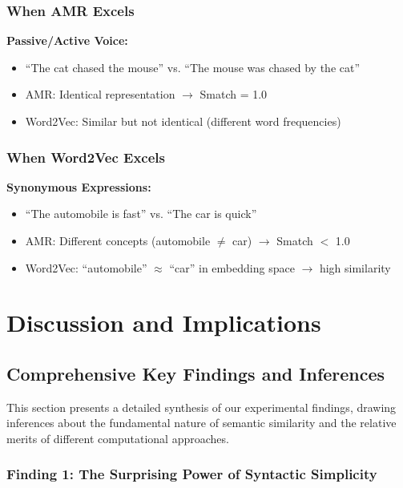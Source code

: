 \documentclass[11pt,a4paper]{article}
\begin{document}
\subsubsection{When AMR Excels}

\textbf{Passive/Active Voice:}
\begin{itemize}
    \item ``The cat chased the mouse'' vs. ``The mouse was chased by the cat''
    \item AMR: Identical representation $\to$ Smatch = 1.0
    \item Word2Vec: Similar but not identical (different word frequencies)
\end{itemize}

\subsubsection{When Word2Vec Excels}

\textbf{Synonymous Expressions:}
\begin{itemize}
    \item ``The automobile is fast'' vs. ``The car is quick''
    \item AMR: Different concepts (automobile $\neq$ car) $\to$ Smatch $<$ 1.0
    \item Word2Vec: ``automobile'' $\approx$ ``car'' in embedding space $\to$ high similarity
\end{itemize}

\section{Discussion and Implications}

\subsection{Comprehensive Key Findings and Inferences}

This section presents a detailed synthesis of our experimental findings, drawing inferences about the fundamental nature of semantic similarity and the relative merits of different computational approaches.

\subsubsection{Finding 1: The Surprising Power of Syntactic Simplicity}
\end{document}

